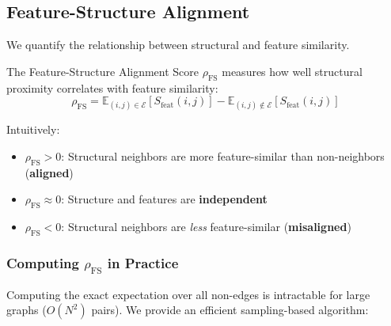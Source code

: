 \subsection{Feature-Structure Alignment}

We quantify the relationship between structural and feature similarity.

\begin{definition}
\label{def:fs_alignment}
The Feature-Structure Alignment Score $\rho_{\text{FS}}$ measures how well structural proximity correlates with feature similarity:
\begin{equation}
\rho_{\text{FS}} = \mathbb{E}_{(i,j) \in \mathcal{E}}[S_{\text{feat}}(i, j)] - \mathbb{E}_{(i,j) \notin \mathcal{E}}[S_{\text{feat}}(i, j)]
\end{equation}
\end{definition}

Intuitively:
\begin{itemize}
    \item $\rho_{\text{FS}} > 0$: Structural neighbors are more feature-similar than non-neighbors (\textbf{aligned})
    \item $\rho_{\text{FS}} \approx 0$: Structure and features are \textbf{independent}
    \item $\rho_{\text{FS}} < 0$: Structural neighbors are \textit{less} feature-similar (\textbf{misaligned})
\end{itemize}

\subsubsection{Computing $\rho_{\text{FS}}$ in Practice}

Computing the exact expectation over all non-edges is intractable for large graphs ($O(N^2)$ pairs). We provide an efficient sampling-based algorithm:

